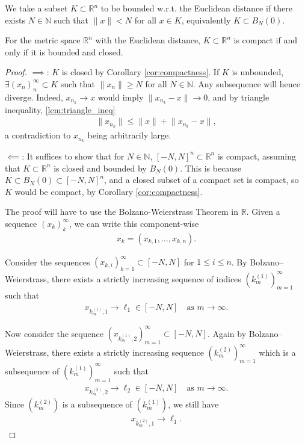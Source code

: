 \begin{remark}
	We take a subset $K \subset \mathbb{R}^{n}$ to be bounded w.r.t. the Euclidean distance if there exists $N \in \mathbb{N}$ such that $\lVert x \rVert < N$ for all $x \in K$, equivalently $K \subset B_{N}(0)$.
\end{remark}

\begin{theorem}\label{thm:heine-borel}
	For the metric space $\mathbb{R}^{n}$ with the Euclidean distance, $K \subset \mathbb{R}^{n}$ is compact if and only if it is bounded and closed.
\end{theorem}
\begin{proof}
	$\implies$: $K$ is closed by Corollary \ref{cor:compactness}. If $K$ is unbounded, $\exists (x_{n})_{n}^{\infty} \subset K$ such that $\lVert x_{n} \rVert \geq N$ for all $N \in \mathbb{N}$. Any subsequence will hence diverge. Indeed, $x_{n_{k}} \to x$ would imply $\lVert x_{n_{k}}-x \rVert \to 0$, and by triangle inequality, \ref{lem:triangle_ineq}
	\begin{align*}
		\lVert x_{n_{k}} \rVert  \leq \lVert x \rVert + \lVert x_{n_{k}} - x \rVert,
	\end{align*}
	a contradiction to $x_{n_{k}}$ being arbitrarily large.

	$\impliedby$: It suffices to show that for $N \in \mathbb{N}$, $[-N, N]^{n} \subset \mathbb{R}^{n}$ is compact, assuming that $K \subset \mathbb{R}^{n}$ is closed and bounded by $B_{N}(0)$. This is because $K \subset B_{N}(0) \subset [-N, N]^{n}$, and a closed subset of a compact set is compact, so $K$ would be compact, by Corollary \ref{cor:compactness}.

	The proof will have to use the Bolzano-Weierstrass Theorem in $\mathbb{R}$. Given a sequence $(x_{k})_{k}^{\infty}$, we can write this component-wise
	\begin{align*}
		x_{k} = (x_{k,1}, \dots, x_{k, n}).
	\end{align*}

	Consider the sequences $(x_{k,i})_{k=1}^{\infty} \subset [-N,N]$ for $1 \le i \le n$.
	By Bolzano--Weierstrass, there exists a strictly increasing sequence of indices
	$(k_m^{(1)})_{m=1}^{\infty}$ such that
	\begin{align*}
		x_{k_m^{(1)},1} \to \ell_1 \in [-N,N]
		\quad \text{as } m \to \infty.
	\end{align*}

	Now consider the sequence $(x_{k_m^{(1)},2})_{m=1}^{\infty} \subset [-N,N]$. Again by Bolzano--Weierstrass, there exists a strictly increasing sequence $(k_m^{(2)})_{m=1}^{\infty}$ which is a subsequence of $(k_m^{(1)})_{m=1}^{\infty}$ such that
	\begin{align*}
		x_{k_m^{(2)},2} \to \ell_2 \in [-N,N] \quad \text{as } m \to \infty.
	\end{align*}
	Since $(k_m^{(2)})$ is a subsequence of $(k_m^{(1)})$, we still have
	\begin{align*}
		x_{k_m^{(2)},1} \to \ell_1.
	\end{align*}


\end{proof}
